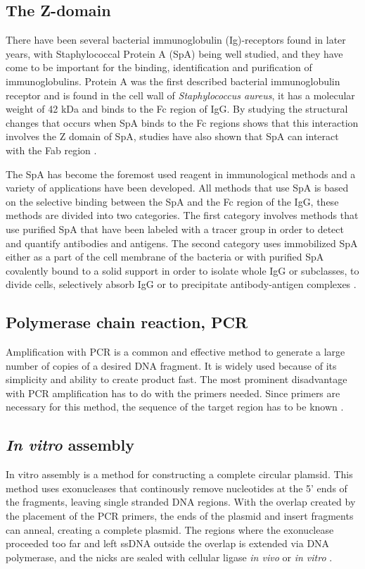 \documentclass{article}
\begin{document}
\begin{multicols}{2}
	\subsection{The Z-domain}
	There have been several bacterial immunoglobulin (Ig)-receptors found in later years, with Staphylococcal Protein A (SpA) being well studied, and they have come to be important for the binding, identification and purification of immunoglobulins. Protein A was the first described bacterial immunoglobulin receptor and is found in the cell wall of \textit{Staphylococcus aureus}, it has a molecular weight of 42 kDa and binds to the Fc region of IgG. By studying the structural changes that occurs when SpA binds to the Fc regions shows that this interaction involves the Z domain of SpA, studies have also shown that SpA can interact with the Fab region \cite{justiz-vaillant_bacterial_nodate}. 
	
	The SpA has become the foremost used reagent in immunological methods and a variety of applications have been developed. All methods that use SpA is based on the selective binding between the SpA and the Fc region of the IgG, these methods are divided into two categories. The first category involves methods that use purified SpA that have been labeled with a tracer group in order to detect and quantify antibodies and antigens. The second category uses immobilized SpA either as a part of the cell membrane of the bacteria or with purified SpA covalently bound to a solid support in order to isolate whole IgG or subclasses, to divide cells, selectively absorb IgG or to precipitate antibody-antigen complexes \cite{langone_applications_1982}.
	
	\subsection{Polymerase chain reaction, PCR}
	Amplification with PCR is a common and effective method to generate a large number of copies of a desired DNA fragment. It is widely used because of its simplicity and ability to create product fast. The most prominent disadvantage with PCR amplification has to do with the primers needed. Since primers are necessary for this method, the sequence of the target region has to be known \cite{li_chapter_2008}. 
	
	\subsection{\textit{In vitro} assembly}
	In vitro assembly is a method for constructing a complete circular plamsid. This method uses exonucleases that continously remove nucleotides at the 5’ ends of the fragments, leaving single stranded DNA regions. With the overlap created by the placement of the PCR primers, the ends of the plasmid and insert fragments can anneal, creating a complete plasmid. The regions where the exonuclease proceeded too far and left ssDNA outside the overlap is extended via DNA polymerase, and the nicks are sealed with cellular ligase \textit{in vivo} or \textit{in vitro} \cite{john}.
	

\end{multicols}
\end{document}
